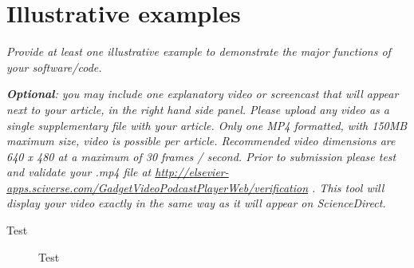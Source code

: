 
\section{Illustrative examples}

\textit{Provide at least one illustrative example to demonstrate the major
functions of your software/code.}

\textit{\textbf{Optional}: you may include one explanatory  video or screencast that will appear next to your article, in the right hand side panel. Please upload any video as a single supplementary file with your article. Only one MP4 formatted, with 150MB maximum size, video is possible per article. Recommended video dimensions are 640 x 480 at a maximum of 30 frames / second. Prior to submission please test and validate your .mp4 file at  \url{http://elsevier-apps.sciverse.com/GadgetVideoPodcastPlayerWeb/verification} . This tool will display your video exactly in the same way as it will appear on ScienceDirect. }

\begin{table}[!h]

\caption{Test}
\label{test}
\end{table}

\begin{figure}[!h]

\caption{Test}
\end{figure}